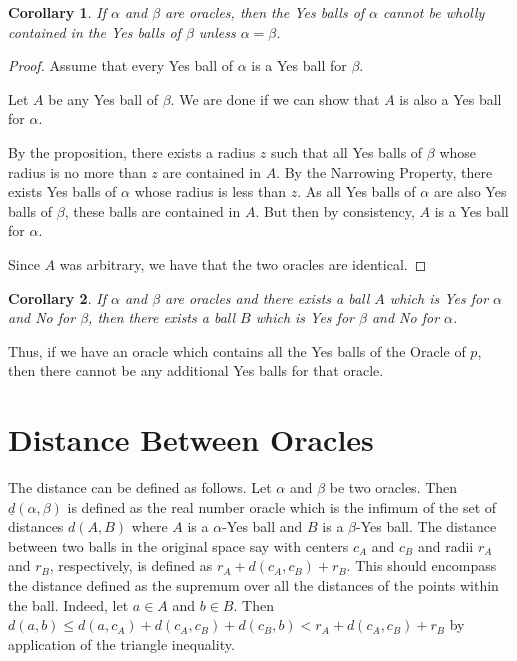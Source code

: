 \documentclass[12pt]{article}
\newtheorem{corollary}{Corollary}[section]
\begin{document}
\begin{corollary}
    If $\alpha$ and $\beta$ are oracles, then the Yes balls of $\alpha$ cannot be wholly contained in the Yes balls of $\beta$ unless $\alpha=\beta$.
\end{corollary}

\begin{proof}
    Assume that every Yes ball of $\alpha$ is a Yes ball for $\beta$.

    Let $A$ be any Yes ball of $\beta$. We are done if we can show that $A$ is also a Yes ball for $\alpha$.
    
    By the proposition, there exists a radius $z$ such that all Yes balls of $\beta$ whose radius is no more than $z$ are contained in $A$. By the Narrowing Property, there exists Yes balls of $\alpha$ whose radius is less than $z$. As all Yes balls of $\alpha$ are also Yes balls of $\beta$, these balls are contained in $A$. But then by consistency, $A$ is a Yes ball for $\alpha$.

    Since $A$ was arbitrary, we have that the two oracles are identical. 
    
\end{proof}

\begin{corollary}\label{cor:yesno}
    If $\alpha$ and $\beta$ are oracles and there exists a ball $A$ which is Yes for $\alpha$ and No for $\beta$, then there exists a ball $B$ which is Yes for $\beta$ and No for $\alpha$. 
\end{corollary}

Thus, if we have an oracle which contains all the Yes balls of the Oracle of $p$, then there cannot be any additional Yes balls for that oracle. 


\section{Distance Between Oracles}

The distance can be defined as follows. Let $\alpha$ and $\beta$ be two oracles. Then $\underline{d}(\alpha,\beta)$ is defined as the real number oracle which is the infimum of the set of distances $d(A, B)$ where $A$ is a $\alpha$-Yes ball and $B$ is a $\beta$-Yes ball. The distance between two balls in the original space say with centers $c_A$ and $c_B$ and radii $r_A$ and $r_B$, respectively, is defined as $r_A + d(c_A,c_B) + r_B$. This should encompass the distance defined as the supremum over all the distances of the points within the ball. Indeed, let $a \in A$ and $b\in B$. Then $d(a, b) \leq d(a,c_A) + d(c_A,c_B) + d(c_B,b) < r_A + d(c_A,c_B) + r_B$ by application of the triangle inequality. 
\end{document}
